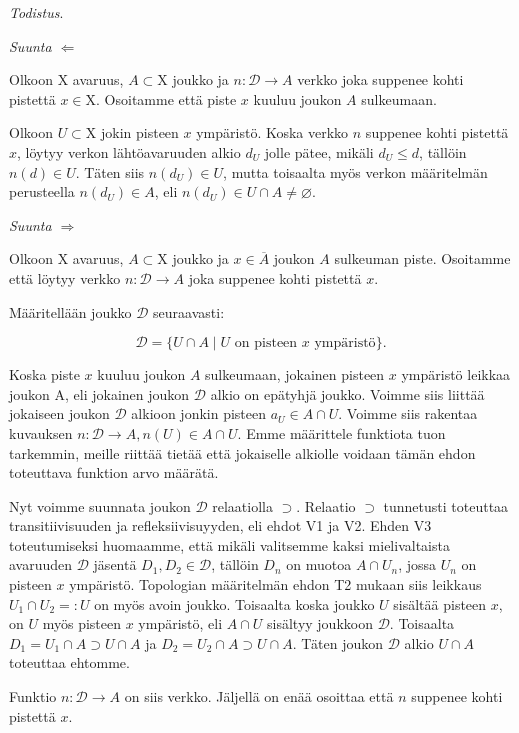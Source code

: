 \documentclass[12pt,a4paper,leqno]{report}
\newcommand{\X}{\mathrm{X}}
\newcommand{\D}{\mathcal{D}}
\newcommand{\verkop}{\leq}
\theoremstyle{plain}
\theoremstyle{definition}
\theoremstyle{remark}
\begin{document}
\noindent\emph{Todistus}.

\emph{Suunta $\Leftarrow$}

Olkoon $\X$ avaruus, $A \subset \X$ joukko ja $n : \D \to A$ verkko joka suppenee kohti pistettä $x \in \X$. Osoitamme että piste $x$ kuuluu joukon $A$ sulkeumaan.

Olkoon $U \subset \X$ jokin pisteen $x$ ympäristö. Koska verkko $n$ suppenee kohti pistettä $x$, löytyy verkon lähtöavaruuden alkio $d_U$ jolle pätee, mikäli $d_U \verkop d$, tällöin $n(d) \in U$. Täten siis $n(d_U) \in U$, mutta toisaalta myös verkon määritelmän perusteella $n(d_U) \in A$, eli $n(d_U) \in U \cap A \not= \varnothing$.

\emph{Suunta $\Rightarrow$}

Olkoon $\X$ avaruus, $A \subset \X$ joukko ja $x \in \overline{A}$ joukon $A$ sulkeuman piste. Osoitamme että löytyy verkko $n : \D \to A$ joka suppenee kohti pistettä $x$.

Määritellään joukko $\D$ seuraavasti:

\begin{equation}
\D = \{U \cap A \mid U \text{ on pisteen }x\text{ ympäristö}\}\text{.}
\end{equation}

Koska piste $x$ kuuluu joukon $A$ sulkeumaan, jokainen pisteen $x$ ympäristö leikkaa joukon A, eli jokainen joukon $\D$ alkio on epätyhjä joukko. Voimme siis liittää jokaiseen joukon $\D$ alkioon jonkin pisteen $a_U \in A \cap U$. Voimme siis rakentaa kuvauksen $n : \D \to A, n(U) \in A \cap U$. Emme määrittele funktiota tuon tarkemmin, meille riittää tietää että jokaiselle alkiolle voidaan tämän ehdon toteuttava funktion arvo määrätä.

Nyt voimme suunnata joukon $\D$ relaatiolla $\supset$. Relaatio $\supset$ tunnetusti toteuttaa transitiivisuuden ja refleksiivisuyyden, eli ehdot V1 ja V2. Ehden V3 toteutumiseksi huomaamme, että mikäli valitsemme kaksi mielivaltaista avaruuden $\D$ jäsentä $D_1, D_2 \in \D$, tällöin $D_n$ on muotoa $A \cap U_n$, jossa $U_n$ on pisteen $x$ ympäristö. Topologian määritelmän ehdon T2 mukaan siis leikkaus $U_1 \cap U_2 =: U$ on myös avoin joukko. Toisaalta koska joukko $U$ sisältää pisteen $x$, on $U$ myös pisteen $x$ ympäristö, eli $A \cap U$ sisältyy joukkoon $\D$. Toisaalta $D_1 = U_1 \cap A \supset U \cap A$ ja $D_2 = U_2 \cap A \supset U \cap A$. Täten joukon $\D$ alkio $U \cap A$ toteuttaa ehtomme.

Funktio $n : \D \to A$ on siis verkko. Jäljellä on enää osoittaa että $n$ suppenee kohti pistettä $x$.
\end{document}

